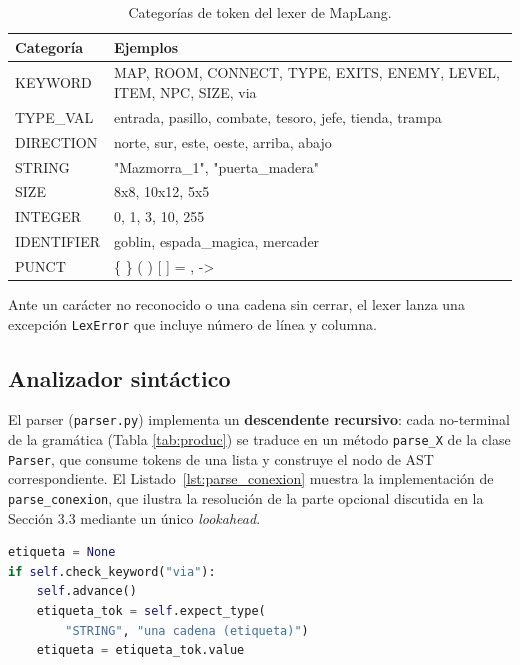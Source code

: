 \documentclass[10pt,twocolumn]{article}
\begin{document}
\begin{table}[h]
\centering
\caption{Categorías de token del lexer de MapLang.}
\label{tab:tokens}
\small
\begin{tabularx}{\linewidth}{l X}
\toprule
\textbf{Categoría} & \textbf{Ejemplos} \\
\midrule
KEYWORD    & MAP, ROOM, CONNECT, TYPE, EXITS, ENEMY, LEVEL, ITEM, NPC, SIZE, via \\
TYPE\_VAL   & entrada, pasillo, combate, tesoro, jefe, tienda, trampa \\
DIRECTION   & norte, sur, este, oeste, arriba, abajo \\
STRING       & "Mazmorra\_1", "puerta\_madera" \\
SIZE          & 8x8, 10x12, 5x5 \\
INTEGER        & 0, 1, 3, 10, 255 \\
IDENTIFIER      & goblin, espada\_magica, mercader \\
PUNCT            & \{ \} ( ) [ ] = , -> \\
\bottomrule
\end{tabularx}
\end{table}

Ante un carácter no reconocido o una cadena sin cerrar, el lexer lanza una
excepción \texttt{LexError} que incluye número de línea y columna.

\subsection{Analizador sintáctico}

El parser (\texttt{parser.py}) implementa un \textbf{descendente
recursivo}: cada no-terminal de la gramática (Tabla \ref{tab:produc}) se
traduce en un método \texttt{parse\_X} de la clase \texttt{Parser}, que
consume tokens de una lista y construye el nodo de AST correspondiente. El
Listado~\ref{lst:parse_conexion} muestra la implementación de
\texttt{parse\_conexion}, que ilustra la resolución de la parte opcional
discutida en la Sección 3.3 mediante un único \textit{lookahead}.

\begin{lstlisting}[language=Python,caption={Fragmento de \texttt{parse\_conexion} (parte opcional vía LL(1)).},label={lst:parse_conexion}]
etiqueta = None
if self.check_keyword("via"):
    self.advance()
    etiqueta_tok = self.expect_type(
        "STRING", "una cadena (etiqueta)")
    etiqueta = etiqueta_tok.value
\end{lstlisting}
\end{document}
